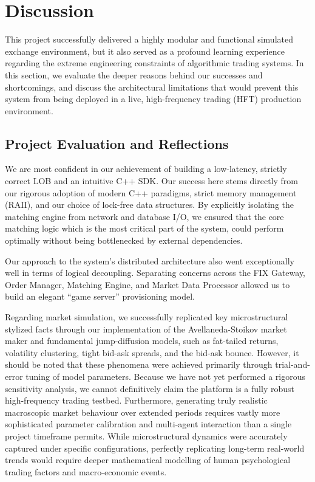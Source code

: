 \documentclass[12pt,a4paper]{article}
\begin{document}
\section{Discussion}

This project successfully delivered a highly modular and functional simulated exchange environment, but it also served as a profound learning experience regarding the extreme engineering constraints of algorithmic trading systems. In this section, we evaluate the deeper reasons behind our successes and shortcomings, and discuss the architectural limitations that would prevent this system from being deployed in a live, high-frequency trading (HFT) production environment.

\subsection{Project Evaluation and Reflections}
We are most confident in our achievement of building a low-latency, strictly correct LOB and an intuitive C++ SDK. Our success here stems directly from our rigorous adoption of modern C++ paradigms, strict memory management (RAII), and our choice of lock-free data structures. By explicitly isolating the matching engine from network and database I/O, we ensured that the core matching logic which is the most critical part of the system, could perform optimally without being bottlenecked by external dependencies.

Our approach to the system's distributed architecture also went exceptionally well in terms of logical decoupling. Separating concerns across the FIX Gateway, Order Manager, Matching Engine, and Market Data Processor allowed us to build an elegant ``game server'' provisioning model.

Regarding market simulation, we successfully replicated key microstructural stylized facts through our implementation of the Avellaneda-Stoikov market maker and fundamental jump-diffusion models, such as fat-tailed returns, volatility clustering, tight bid-ask spreads, and the bid-ask bounce. However, it should be noted that these phenomena were achieved primarily through trial-and-error tuning of model parameters. Because we have not yet performed a rigorous sensitivity analysis, we cannot definitively claim the platform is a fully robust high-frequency trading testbed. Furthermore, generating truly realistic macroscopic market behaviour over extended periods requires vastly more sophisticated parameter calibration and multi-agent interaction than a single project timeframe permits. While microstructural dynamics were accurately captured under specific configurations, perfectly replicating long-term real-world trends would require deeper mathematical modelling of human psychological trading factors and macro-economic events.
\end{document}
